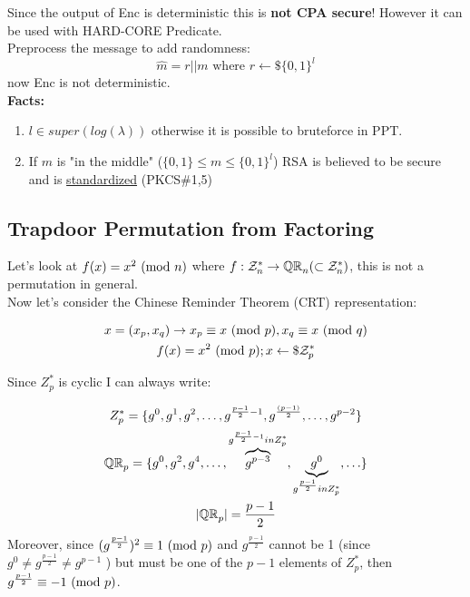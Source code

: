 Since the output of Enc is deterministic this is \textbf{not CPA secure}! However it can be used with HARD-CORE Predicate.\\
Preprocess the message to add randomness:
$$\hat{m}=r||m \text{ where }r\leftarrow\mathdollar\{0,1\}^l$$
now Enc is not deterministic.\\
\textbf{Facts:}
\begin{enumerate}
    \item $l \in super(log(\lambda))$ otherwise it is possible to bruteforce in PPT.
    \item If $m$ is "in the middle" ($\{0,1\} \leq m \leq \{0,1\}^l$) RSA is believed to be secure and is \underline{standardized} (PKCS\#1,5)
\end{enumerate}



\subsection{Trapdoor Permutation from Factoring}
Let's look at $f(x)=x^2\Mod{n}$ where $f: \Z_n^* \to \QR[n] (\subset \Z_n^*)$, this is not a permutation in general.\\
Now let's consider the Chinese Reminder Theorem (CRT) representation:

    \begin{gather*}
        x=(x_p,x_q) \rightarrow x_p\equiv x\Mod{p} , x_q\equiv x\Mod{q}\\
        f(x)=x^2\Mod{p}; x \from \$ \Z_p^*
    \end{gather*}

Since $Z_p^*$ is cyclic I can always write:

\begin{gather*}
    Z_p^*=\{g^0,g^1,g^2,\ldots,g^{\frac{p-1}{2}-1},g^{\frac{(p-1)}{2}},\ldots,g^{p-2} \}\\
    \QR[p]=\{g^0,g^2,g^4,\ldots,\overbrace{g^{p-3}}^{g^{\frac{p-1}{2}-1} in Z_p^*},\underbrace{g^0}_{g^{\frac{p-1}{2}}in Z_p^*},\ldots\}\\
    |\QR[p]|=\frac{p-1}{2}
\end{gather*}
Moreover, since $(g^{\frac{p-1}{2}})^2 \equiv 1 \Mod{p} $ and $g^{\frac{p-1}{2}}$
cannot be 1 (since $g^{0}\not=g^{\frac{p-1}{2}}\not=g^{p-1}$ ) but must be one
of the $p-1$ elements of $Z_{p}^{*}$, then
$g^{\frac{p-1}{2}} \equiv -1 \Mod{p}$.\\

